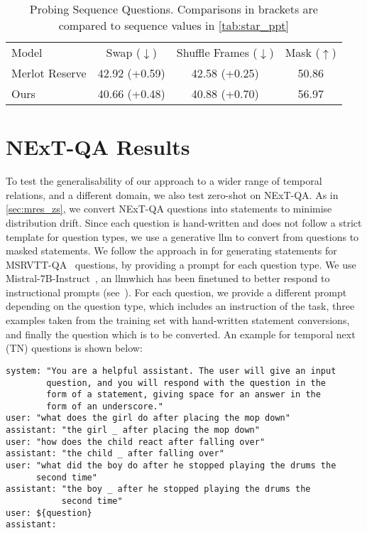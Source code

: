 \begin{table}[t]
	\centering
	\caption{Probing Sequence Questions. Comparisons in brackets are compared
	to sequence values in \cref{tab:star_ppt}}
	\label{tab:probe_final}
	\begin{tabular}{lccc}
	\toprule
	Model & Swap ($\downarrow$) & Shuffle Frames ($\downarrow$) & Mask ($\uparrow$) \\
        \cmidrule(r){1-1}             \cmidrule(){2-4}
		Merlot Reserve & 42.92 (+0.59) & 42.58 (+0.25)  & 50.86 \\
		Ours & 40.66 (+0.48) & 40.88 (+0.70) & 56.97 \\
	\bottomrule
	\end{tabular}
\end{table}

\section{NExT-QA Results}
\label{sec:nextqa_results}

To test the generalisability of our approach to a wider range of temporal
relations, and a different domain, we also test zero-shot on NExT-QA. As in
\cref{sec:mres_zs}, we convert NExT-QA questions into statements to minimise
distribution drift. Since each question is hand-written and does not follow a
strict template for question types, we use a generative \acrshort{llm} to
convert from questions to masked statements. We follow the approach in
\citet{zellers2022mreserve} for generating statements for
MSRVTT-QA~\citep{xu2016msr-vtt} questions, by providing a prompt for each
question type. We use Mistral-7B-Instruct~\cite{jiang2023mistral}, an
\acrshort{llm}which has been finetuned to better respond to instructional
prompts (see~\citet{ouyang2022instructgpt}). For each question, we provide a
different prompt depending on the question type, which includes an instruction
of the task, three examples taken from the training set with hand-written
statement conversions, and finally the question which is to be converted. An example
for temporal next (TN) questions is shown below:

\begin{verbatim}
system: "You are a helpful assistant. The user will give an input
        question, and you will respond with the question in the
        form of a statement, giving space for an answer in the
        form of an underscore."
user: "what does the girl do after placing the mop down"
assistant: "the girl _ after placing the mop down"
user: "how does the child react after falling over"
assistant: "the child _ after falling over"
user: "what did the boy do after he stopped playing the drums the 
      second time"
assistant: "the boy _ after he stopped playing the drums the 
           second time"
user: ${question}
assistant: 
\end{verbatim}

